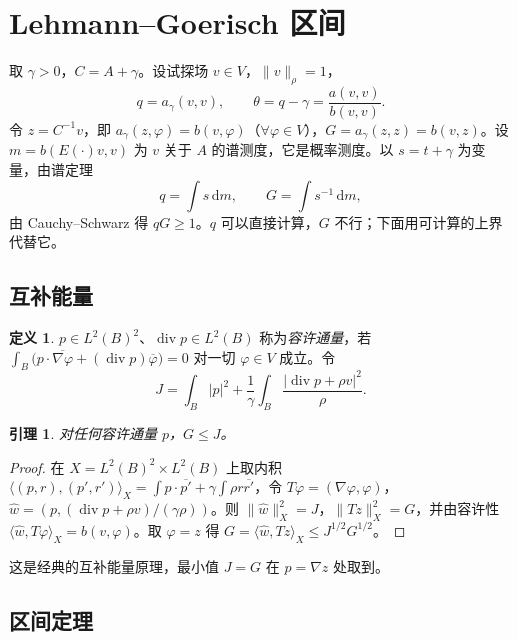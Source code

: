 \documentclass[11pt,a4paper,fontset=fandol]{ctexart}
\newcommand{\dd}{\mathrm{d}}
\theoremstyle{plain}
\newtheorem{lemma}[theorem]{引理}
\theoremstyle{definition}
\newtheorem{definition}[theorem]{定义}
\theoremstyle{remark}
\begin{document}
\section{Lehmann--Goerisch 区间}
\label{sec:goerisch}
取 $\gamma>0$，$C=A+\gamma$。设试探场 $v\in V$，$\|v\|_\rho=1$，
\[
q=a_\gamma(v,v),\qquad\theta=q-\gamma=\frac{a(v,v)}{b(v,v)} .
\]
令 $z=C^{-1}v$，即 $a_\gamma(z,\varphi)=b(v,\varphi)$（$\forall\varphi\in V$），$G=a_\gamma(z,z)=b(v,z)$。设 $m=b(E(\cdot)v,v)$ 为 $v$ 关于 $A$ 的谱测度，它是概率测度。以 $s=t+\gamma$ 为变量，由谱定理
\begin{equation}
\label{eq:qG}
q=\int s\,\dd m,\qquad G=\int s^{-1}\,\dd m ,
\end{equation}
由 Cauchy--Schwarz 得 $qG\ge1$。$q$ 可以直接计算，$G$ 不行；下面用可计算的上界代替它。

\subsection{互补能量}

\begin{definition}
\label{def:admissible}
$p\in L^2(B)^2$、$\operatorname{div}p\in L^2(B)$ 称为\emph{容许通量}，若 $\int_B\bigl(p\cdot\overline{\nabla\varphi}+(\operatorname{div}p)\overline\varphi\bigr)=0$ 对一切 $\varphi\in V$ 成立。令
\begin{equation}
\label{eq:J}
J=\int_B|p|^2+\frac1\gamma\int_B\frac{|\operatorname{div}p+\rho v|^2}{\rho}.
\end{equation}
\end{definition}

\begin{lemma}
\label{lem:JG}
对任何容许通量 $p$，$G\le J$。
\end{lemma}

\begin{proof}
在 $X=L^2(B)^2\times L^2(B)$ 上取内积 $\langle(p,r),(p',r')\rangle_X=\int p\cdot\overline{p'}+\gamma\int\rho r\overline{r'}$，令 $T\varphi=(\nabla\varphi,\varphi)$，$\hat w=(p,(\operatorname{div}p+\rho v)/(\gamma\rho))$。则 $\|\hat w\|_X^2=J$，$\|Tz\|_X^2=G$，并由容许性 $\langle\hat w,T\varphi\rangle_X=b(v,\varphi)$。取 $\varphi=z$ 得 $G=\langle\hat w,Tz\rangle_X\le J^{1/2}G^{1/2}$。
\end{proof}

这是经典的互补能量原理，最小值 $J=G$ 在 $p=\nabla z$ 处取到。

\subsection{区间定理}
\end{document}
